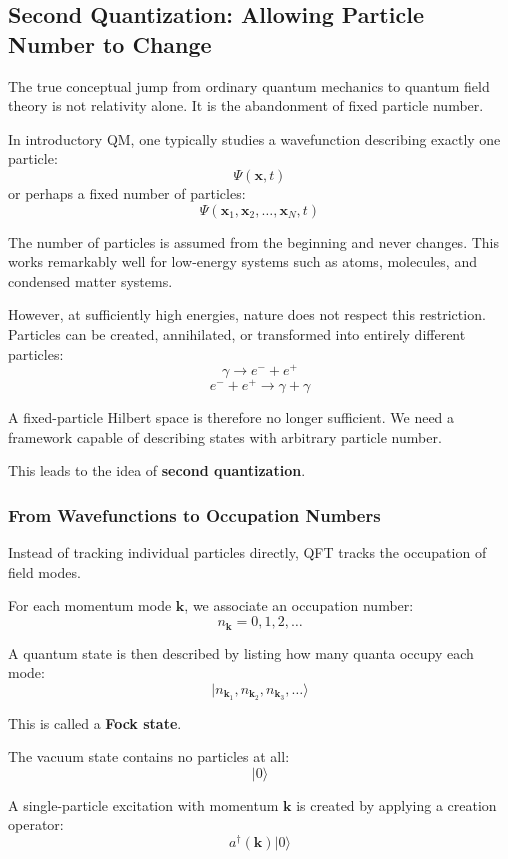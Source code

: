 \subsection*{Second Quantization: Allowing Particle Number to Change}

The true conceptual jump from ordinary quantum mechanics to quantum field theory is not relativity alone.
It is the abandonment of fixed particle number.

In introductory QM, one typically studies a wavefunction describing exactly one particle:
\[
\Psi(\mathbf{x}, t)
\]
or perhaps a fixed number of particles:
\[
\Psi(\mathbf{x}_1, \mathbf{x}_2, \dots, \mathbf{x}_N, t)
\]

The number of particles is assumed from the beginning and never changes.
This works remarkably well for low-energy systems such as atoms, molecules, and condensed matter systems.

However, at sufficiently high energies, nature does not respect this restriction.
Particles can be created, annihilated, or transformed into entirely different particles:
\[
\gamma \rightarrow e^- + e^+
\]
\[
e^- + e^+ \rightarrow \gamma + \gamma
\]

A fixed-particle Hilbert space is therefore no longer sufficient.
We need a framework capable of describing states with arbitrary particle number.

This leads to the idea of \textbf{second quantization}.

\subsubsection*{From Wavefunctions to Occupation Numbers}

Instead of tracking individual particles directly, QFT tracks the occupation of field modes.

For each momentum mode $\mathbf{k}$, we associate an occupation number:
\[
n_{\mathbf{k}} = 0,1,2,\dots
\]

A quantum state is then described by listing how many quanta occupy each mode:
\[
|n_{\mathbf{k}_1}, n_{\mathbf{k}_2}, n_{\mathbf{k}_3}, \dots \rangle
\]

This is called a \textbf{Fock state}.

The vacuum state contains no particles at all:
\[
|0\rangle
\]

A single-particle excitation with momentum $\mathbf{k}$ is created by applying a creation operator:
\[
a^\dagger(\mathbf{k}) |0\rangle
\]

